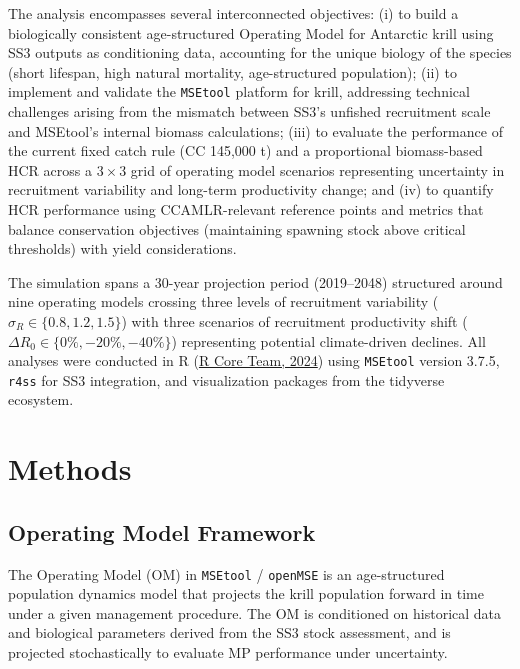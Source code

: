 \documentclass[
]{article}
\begin{document}
The analysis encompasses several interconnected objectives: (i) to build a biologically consistent age-structured Operating Model for Antarctic krill using SS3 outputs as conditioning data, accounting for the unique biology of the species (short lifespan, high natural mortality, age-structured population); (ii) to implement and validate the \texttt{MSEtool} platform for krill, addressing technical challenges arising from the mismatch between SS3's unfished recruitment scale and MSEtool's internal biomass calculations; (iii) to evaluate the performance of the current fixed catch rule (CC 145,000 t) and a proportional biomass-based HCR across a \(3 \times 3\) grid of operating model scenarios representing uncertainty in recruitment variability and long-term productivity change; and (iv) to quantify HCR performance using CCAMLR-relevant reference points and metrics that balance conservation objectives (maintaining spawning stock above critical thresholds) with yield considerations.

The simulation spans a 30-year projection period (2019--2048) structured around nine operating models crossing three levels of recruitment variability (\(\sigma_R \in \{0.8, 1.2, 1.5\}\)) with three scenarios of recruitment productivity shift (\(\Delta R_0 \in \{0\%, -20\%, -40\%\}\)) representing potential climate-driven declines. All analyses were conducted in R (\protect\hyperlink{ref-R-base}{R Core Team, 2024}) using \texttt{MSEtool} version 3.7.5, \texttt{r4ss} for SS3 integration, and visualization packages from the tidyverse ecosystem.

\pagebreak

\hypertarget{methods}{%
\section{Methods}\label{methods}}

\hypertarget{operating-model-framework}{%
\subsection{Operating Model Framework}\label{operating-model-framework}}

The Operating Model (OM) in \texttt{MSEtool} / \texttt{openMSE} is an age-structured population dynamics model that projects the krill population forward in time under a given management procedure. The OM is conditioned on historical data and biological parameters derived from the SS3 stock assessment, and is projected stochastically to evaluate MP performance under uncertainty.
\end{document}
